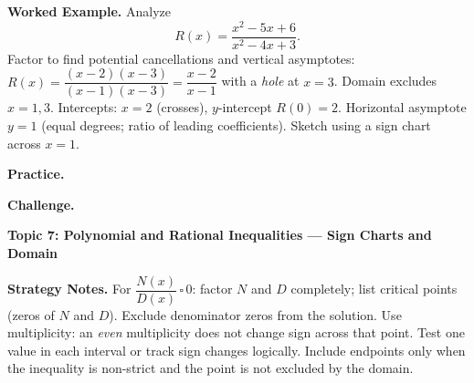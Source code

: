 \documentclass[12pt]{exam}
\begin{document}
\begin{questions}
\textbf{Worked Example.} Analyze
\[R(x)=\frac{x^2-5x+6}{x^2-4x+3}.\]
Factor to find potential cancellations and vertical asymptotes: $R(x)=\dfrac{(x-2)(x-3)}{(x-1)(x-3)}=\dfrac{x-2}{x-1}$ with a \emph{hole} at $x=3$. Domain excludes $x=1,3$. Intercepts: $x=2$ (crosses), $y$-intercept $R(0)=2$. Horizontal asymptote $y=1$ (equal degrees; ratio of leading coefficients). Sketch using a sign chart across $x=1$.

\vspace{0.2cm}
\textbf{Practice.}

\textbf{Challenge.}

\newpage

\question
\textbf{Topic 7: Polynomial and Rational Inequalities --- Sign Charts and Domain}

\textbf{Strategy Notes.} For $\dfrac{N(x)}{D(x)}\,\square\,0$: factor $N$ and $D$ completely; list critical points (zeros of $N$ and $D$). Exclude denominator zeros from the solution. Use multiplicity: an \emph{even} multiplicity does not change sign across that point. Test one value in each interval or track sign changes logically. Include endpoints only when the inequality is non-strict and the point is not excluded by the domain.


\end{questions}
\end{document}
